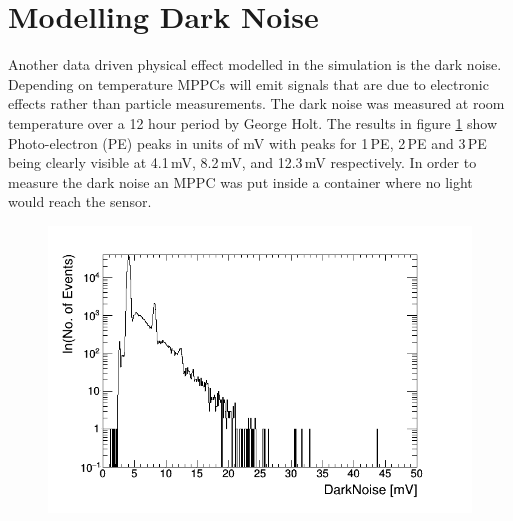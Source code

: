 \section{Modelling Dark Noise}\label{sec:geant4Simulation_ModellingDarkNoise}
Another data driven physical effect modelled in the simulation is the dark noise. Depending on temperature MPPCs will emit signals that are due to electronic effects rather than particle measurements. The dark noise was measured at room temperature over a 12 hour period by George Holt. The results in figure \ref{fig:pureDarkNoise} show Photo-electron (PE) peaks in units of mV with peaks for 1\,PE, 2\,PE and 3\,PE being clearly visible at 4.1\,mV, 8.2\,mV, and 12.3\,mV respectively. In order to measure the dark noise an MPPC was put inside a container where no light would reach the sensor. 
\begin{figure}[htbp]
 \centering
 \includegraphics[width=0.8\linewidth]{pureDarkNoise_output.png}
 \label{fig:pureDarkNoise}
\end{figure}

